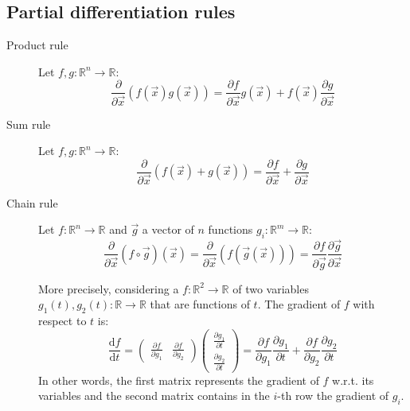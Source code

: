 \subsection{Partial differentiation rules}
\begin{description}
    \item[Product rule] 
        Let $f, g: \mathbb{R}^n \rightarrow \mathbb{R}$:
        \[ 
            \frac{\partial}{\partial \vec{x}} (f(\vec{x})g(\vec{x})) = 
                \frac{\partial f}{\partial \vec{x}} g(\vec{x}) + f(\vec{x}) \frac{\partial g}{\partial \vec{x}}
        \]
    \item[Sum rule] 
        Let $f, g: \mathbb{R}^n \rightarrow \mathbb{R}$:
        \[
            \frac{\partial}{\partial \vec{x}} (f(\vec{x}) + g(\vec{x})) =
                \frac{\partial f}{\partial \vec{x}} + \frac{\partial g}{\partial \vec{x}}
        \]
    \item[Chain rule] 
        Let $f: \mathbb{R}^n \rightarrow \mathbb{R}$ and $\vec{g}$ a vector of $n$ functions $g_i: \mathbb{R}^m \rightarrow \mathbb{R}$:
        \[
            \frac{\partial}{\partial \vec{x}} (f \circ \vec{g})(\vec{x}) = 
                \frac{\partial}{\partial \vec{x}} (f(\vec{g}(\vec{x}))) =
                \frac{\partial f}{\partial \vec{g}} \frac{\partial \vec{g}}{\partial \vec{x}}
        \]

        More precisely, considering a $f: \mathbb{R}^2 \rightarrow \mathbb{R}$ of two variables 
        $g_1(t), g_2(t): \mathbb{R} \rightarrow \mathbb{R}$ that are functions of $t$. 
        The gradient of $f$ with respect to $t$ is:
        \[
            \frac{\text{d}f}{\text{d}t} = 
            \begin{pmatrix}
                \frac{\partial f}{\partial g_1} & \frac{\partial f}{\partial g_2}
            \end{pmatrix}
            \begin{pmatrix}
                \frac{\partial g_1}{\partial t} \\ \frac{\partial g_2}{\partial t}
            \end{pmatrix}
            = \frac{\partial f}{\partial g_1} \frac{\partial g_1}{\partial t} + \frac{\partial f}{\partial g_2} \frac{\partial g_2}{\partial t}
        \]
        In other words, the first matrix represents the gradient of $f$ w.r.t. its variables and 
        the second matrix contains in the $i$-th row the gradient of $g_i$.


\end{description}
